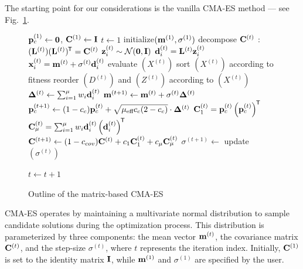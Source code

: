 \documentclass[dvipsnames,format=sigconf,anonymous=false,review=false]{acmart}
\begin{document}
The starting point for our considerations is the vanilla  CMA-ES method \cite{hansen2006cma} --- see Fig.~\ref{alg:cmaes}. 
%
\begin{figure}[h!]
\begin{algorithmic}[1]
\STATE ${\bf p}_c^{(1)} \gets {\bf 0}$, 
${\bf C}^{(1)} \gets {\bf I}$
\STATE $t \gets 1$
\STATE initialize$({\bf m}^{(1)},\sigma^{(1)})$
  \STATE decompose ${\bf C}^{(t)}$ : $({\bf L}^{(t)})({\bf L}^{(t)})^{\mkern-1.5mu\mathsf{T}}={\bf C}^{(t)}$
      \STATE $ {\bf z}_i^{(t)} \sim {\mathcal N}({\bf 0}, {\bf I}) $
      \STATE $ {\bf d}_i^{(t)} ={\bf L}^{(t)} {\bf z}_i^{(t)}$
      \STATE $ {\bf x}_i^{(t)} = {\bf m}^{(t)} + \sigma^{(t)} {\bf d}_i^{(t)} $
   \ENDFOR
   \STATE evaluate $(X^{(t)})$
   \STATE sort $(X^{(t)})$ according to fitness
   \STATE reorder $(D^{(t)})$ and $(Z^{(t)})$ according to $(X^{(t)})$   
   \STATE ${\bf \Delta}^{(t)} \gets \sum_{i=1}^\mu w_i {\bf d}_i^{(t)} $
   \STATE ${\bf m}^{(t+1)} \gets {\bf m}^{(t)} + \sigma^{(t)} {\bf \Delta}^{(t)}$
   \STATE ${\bf p}_c^{(t+1)} \gets (1-c_c){\bf p}_c^{(t)} + \sqrt{\mu_\text{eff} c_c(2-c_c)} \cdot {\bf \Delta}^{(t)}$
   \STATE ${\bf C}_1^{(t)}= {\bf p}_c^{(t)}\left({\bf p}_c^{(t)}\right)^{\mkern-1.5mu\mathsf{T}}$
   \STATE ${\bf C}_\mu^{(t)}= \sum_{i=1}^\mu w_i{\bf d}_i^{(t)}\left({\bf d}_i^{(t)}\right)^{\mkern-1.5mu\mathsf{T}}$
   \STATE ${\bf C}^{(t+1)} \gets (1-c_{cov}){\bf C}^{(t)} + c_1 {\bf C}^{(t)}_1 + c_\mu  {\bf C}^{(t)}_\mu$
   \STATE $\sigma^{(t+1)} \gets $ update $(\sigma^{(t)} )   $
      
   \STATE $t \gets t+1$
\ENDWHILE

\end{algorithmic}
\caption{Outline of the matrix-based CMA-ES}
\label{alg:cmaes}
\end{figure}
%
CMA-ES operates by maintaining a multivariate normal distribution to sample candidate solutions during the optimization process. This distribution is parameterized by three components: the mean vector ${\bf m}^{(t)}$, the covariance matrix ${\bf C}^{(t)}$, and the step-size $\sigma^{(t)}$, where $t$ represents the iteration index. Initially, ${\bf C}^{(1)}$ is set to the identity matrix ${\bf I}$, while ${\bf m}^{(1)}$ and $\sigma^{(1)}$ are specified by the user.
\end{document}

